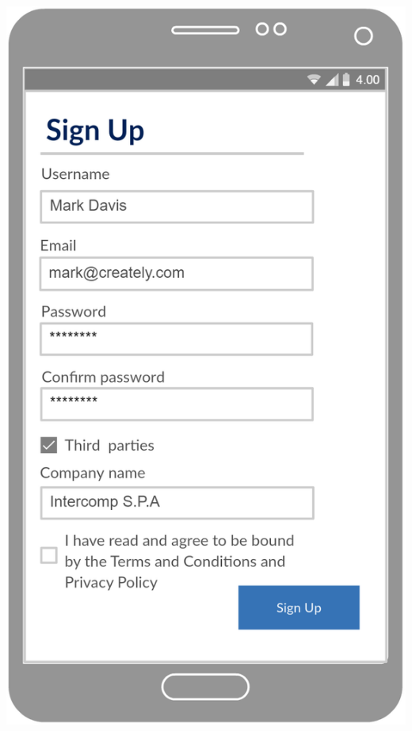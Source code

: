 \begin{center}
\begin{minipage}[c]{.40\textwidth}
\end{minipage}%
\hspace{10mm}%
\begin{minipage}[c]{.40\textwidth}
\centering
\includegraphics[width=1\textwidth]{Images/userInterface/SignUp}
\end{minipage}
\end{center}
  
